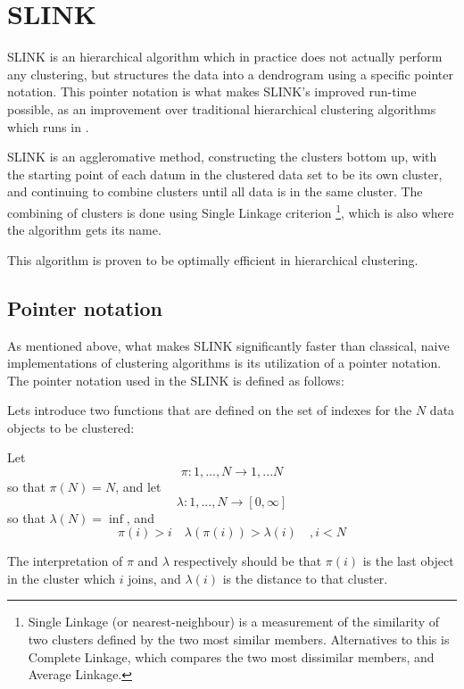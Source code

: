 \newpage

\section{SLINK}

SLINK is an hierarchical algorithm which in practice does not actually
perform any clustering, but structures the data into a dendrogram using
a specific pointer notation. This pointer notation is what makes SLINK's
improved run-time  possible, as an improvement over 
traditional hierarchical clustering algorithms which runs in .

SLINK is an aggleromative method, constructing the clusters bottom up, 
with the starting point of each datum in the clustered data set to 
be its own cluster, and continuing to combine clusters until all data
is in the same cluster. The combining of clusters is done using 
Single Linkage criterion \footnote{
    Single Linkage (or nearest-neighbour) is a measurement of the 
    similarity of two clusters defined by the two most similar members. 
    Alternatives to this is Complete Linkage, which compares the two 
    most dissimilar members, and Average Linkage.
}, which is also where the algorithm gets its name. 

This algorithm is proven to be optimally efficient in hierarchical 
clustering. \cite{SLINK}

\subsection{Pointer notation}
As mentioned above, what makes SLINK significantly faster than classical, 
naive implementations of clustering algorithms is its utilization of a 
pointer notation. The pointer notation used in the SLINK is defined as 
follows:

Lets introduce two functions that are defined on the set of indexes for
the $N$ data objects to be clustered:

\begin{definition}
\label{definition:pointer-representation}
    Let 
    $$
        \pi : 1,...,N \rightarrow 1,...N
    $$
    so that $\pi(N) = N$, and let 
    $$
        \lambda : 1,...,N \rightarrow [0, \infty]
    $$
    so that $\lambda(N) = \inf$, and  
    $$
        \pi(i) > i \quad \lambda(\pi(i)) > \lambda(i) \quad ,i < N
    $$
\end{definition}

The interpretation of $\pi$ and $\lambda$ respectively should be that
$\pi(i)$ is the last object in the cluster which $i$ joins, and $\lambda(i)$
is the distance to that cluster. 

